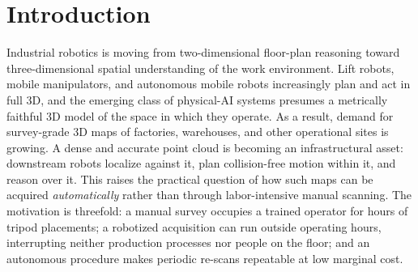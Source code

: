 \documentclass[sensors,article,submit,pdftex,moreauthors]{Definitions/mdpi}
\begin{document}

\section{Introduction}

Industrial robotics is moving from two-dimensional floor-plan reasoning toward
three-dimensional spatial understanding of the work environment. Lift robots,
mobile manipulators, and autonomous mobile robots increasingly plan and act in
full 3D, and the emerging class of physical-AI systems presumes a metrically
faithful 3D model of the space in which they operate. As a result, demand for
survey-grade 3D maps of factories, warehouses, and other operational sites is
growing. A dense and accurate point cloud is becoming an infrastructural
asset: downstream robots localize against it, plan collision-free motion within
it, and reason over it. This raises the practical question of how such maps can be acquired
\emph{automatically} rather than through labor-intensive manual scanning. The
motivation is threefold: a manual survey occupies a trained operator for hours
of tripod placements; a robotized acquisition can run outside operating hours,
interrupting neither production processes nor people on the floor; and an
autonomous procedure makes periodic re-scans repeatable at low marginal
cost.
\end{document}

